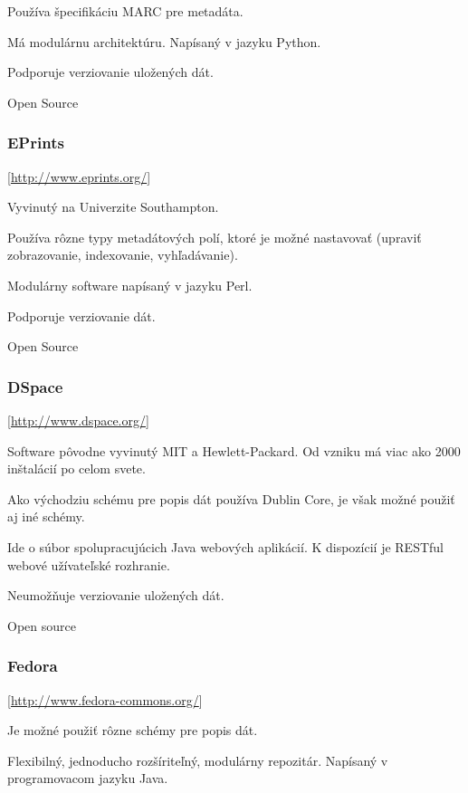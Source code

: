 \documentclass[thesis=M,slovak]{FITthesis}[2013/05/06]
\begin{document}
Používa špecifikáciu MARC pre metadáta.

Má modulárnu architektúru. Napísaný v jazyku Python.

Podporuje verziovanie uložených dát.

Open Source

%

\subsubsection {EPrints} [\url{http://www.eprints.org/}]

Vyvinutý na Univerzite Southampton.

Používa rôzne typy metadátových polí, ktoré je možné nastavovať (upraviť zobrazovanie, indexovanie, vyhľadávanie).

Modulárny software napísaný v jazyku Perl.

Podporuje verziovanie dát.

Open Source

\subsubsection {DSpace} [\url{http://www.dspace.org/}]

Software pôvodne vyvinutý MIT a Hewlett-Packard. Od vzniku má viac ako 2000 inštalácií po celom svete. 

Ako východziu schému pre popis dát používa Dublin Core, je však možné použiť aj iné schémy.

Ide o súbor spolupracujúcich Java webových aplikácií. K dispozícií je RESTful webové užívateľské rozhranie.

Neumožňuje verziovanie uložených dát.

Open source

\subsubsection {Fedora} [\url{http://www.fedora-commons.org/}]

Je možné použiť rôzne schémy pre popis dát.

Flexibilný, jednoducho rozšíriteľný, modulárny repozitár. Napísaný v programovacom jazyku Java.
\end{document}
